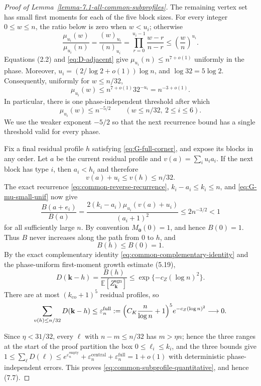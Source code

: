 \documentclass[a4paper,10pt,reqno]{amsart}
\numberwithin{equation}{section}
\newcommand{\Exp}[1]{\mathbb{E}\!\left[#1\right]}
\newcommand{\displayheading}[1]{\par\addvspace{0.68\baselineskip}\noindent{\scshape #1.}\par\nobreak\smallskip\noindent}
\theoremstyle{plain}
\theoremstyle{remark}
\begin{document}
\begin{proof}[Proof of Lemma~\ref{lemma-7.1-all-common-subprofiles}]
The remaining vertex set has small first moments for each of the five
block sizes. For every integer $0\le w\le n$, the ratio below is zero when
$w<u_i$; otherwise
\[
  \frac{\mu_{u_i}(w)}{\mu_{u_i}(n)}
  =\frac{(w)_{u_i}}{(n)_{u_i}}
  =\prod_{r=0}^{u_i-1}\frac{w-r}{n-r}
  \le\left(\frac wn\right)^{u_i}.
\]
Equations (2.2) and \eqref{eq:D-adjacent} give
$\mu_{u_i}(n)\le n^{7+o(1)}$ uniformly in the phase. Moreover,
$u_i=(2/\log 2+o(1))\log n$, and
$\log 32=5\log 2$. Consequently, uniformly for $w\le n/32$,
\begin{equation}
  \mu_{u_i}(w)
  \le
  n^{7+o(1)}32^{-u_i}
  =n^{-3+o(1)}.
  \label{eq:G-mu-small}
\end{equation}
In particular, there is one phase-independent threshold after which
\begin{equation}
  \mu_{u_i}(w)\le n^{-5/2}
  \qquad
  (w\le n/32,\ 2\le i\le6).
  \label{eq:G-mu-small-unif}
\end{equation}
We use the weaker exponent $-5/2$ so that the next recurrence bound has a
single threshold valid for every phase.

Fix a final residual profile $h$ satisfying \eqref{eq:G-full-corner}, and
expose its blocks in any order. Let $a$ be the current residual profile and
$v(a)=\sum_i u_i a_i$. If the next block has type $i$, then
$a_i<h_i$ and therefore
\[
  v(a)+u_i\le v(h)\le n/32.
\]
The exact recurrence \eqref{eq:common-reverse-recurrence}, $k_i-a_i\le k_i\le n$, and
\eqref{eq:G-mu-small-unif} now give
\[
  \frac{B(a+e_i)}{B(a)}
  =
  \frac{2(k_i-a_i)\mu_{u_i}(v(a)+u_i)}{(a_i+1)^2}
  \le2n^{-3/2}<1
\]
for all sufficiently large $n$.  By convention $M_{\mathbf0}(0)=1$, and hence
$B(0)=1$.  Thus $B$ never increases along the path from $0$ to $h$, and
\begin{equation}
  B(h)\le B(0)=1.
  \label{eq:G-B}
\end{equation}
By the exact complementary identity \eqref{eq:common-complementary-identity} and the phase-uniform first-moment
growth estimate (5.19),
\begin{equation}
  D(\mathbf k-h)
  =\frac{B(h)}{\Exp{Z_{\mathbf k}^{\mathrm{sgn}}}}
  \le \exp\{-c_Z(\log n)^2\}.
  \label{eq:G-full-bound}
\end{equation}
There are at most $(k_{\mathrm{co}}+1)^5$ residual profiles, so
\[
  \sum_{v(h)\le n/32}D(\mathbf k-h)\le\varepsilon_n^{\mathrm{full}}
  :=\Bigl(C_K\frac n{\log n}+1\Bigr)^5e^{-c_Z(\log n)^2}\longrightarrow0.
\]

\displayheading{Summing the three ranges}
Since $\eta<31/32$, every $\ell$ with $n-m\le n/32$ has $m>\eta n$; hence
the three ranges at the start of the proof partition the box
$0\le\ell_i\le k_i$, and the three bounds give
$1\le\sum_{\ell}D(\ell)\le e^{\varepsilon_n^{\mathrm{empty}}}
+\varepsilon_n^{\mathrm{central}}+\varepsilon_n^{\mathrm{full}}=1+o(1)$
with deterministic phase-independent errors. This proves
\eqref{eq:common-subprofile-quantitative}, and hence (7.7).
 \end{proof}
\end{document}
